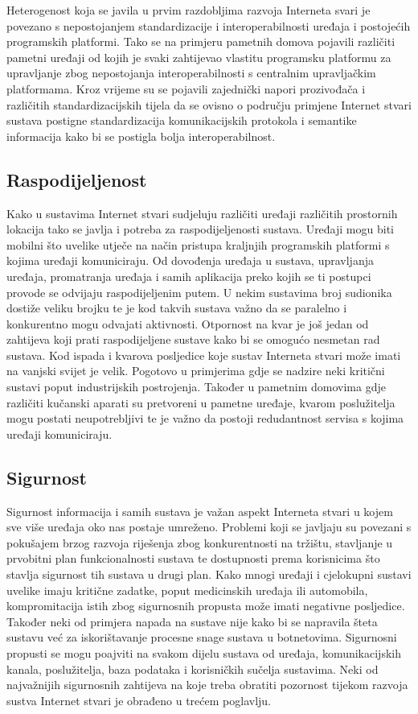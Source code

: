 \documentclass[times, utf8, diplomski]{fer}
\begin{document}
Heterogenost koja se javila u prvim razdobljima razvoja Interneta svari je povezano s nepostojanjem standardizacije i interoperabilnosti uređaja i postojećih programskih platformi. Tako se na primjeru pametnih domova pojavili različiti pametni uređaji od kojih je svaki zahtijevao vlastitu programsku platformu za upravljanje zbog nepostojanja interoperabilnosti s centralnim upravljačkim platformama. Kroz vrijeme su se pojavili zajednički napori prozivođača i različitih standardizacijskih tijela da se ovisno o području primjene Internet stvari sustava postigne standardizacija komunikacijskih protokola i semantike informacija kako bi se postigla bolja interoperabilnost.

\subsection{Raspodijeljenost}
Kako u sustavima Internet stvari sudjeluju različiti uređaji različitih prostornih lokacija tako se javlja i potreba za raspodijeljenosti sustava. Uređaji mogu biti mobilni što uvelike utječe na način pristupa kraljnjih programskih platformi s kojima uređaji komuniciraju. Od dovođenja uređaja u sustava, upravljanja uređaja, promatranja uređaja i samih aplikacija preko kojih se ti postupci provode se odvijaju raspodijeljenim putem. U nekim sustavima broj sudionika dostiže veliku brojku te je kod takvih sustava važno da se paralelno i konkurentno mogu odvajati aktivnosti. Otpornost na kvar je još jedan od zahtijeva koji prati raspodijeljene sustave kako bi se omogućo nesmetan rad sustava. Kod ispada i kvarova posljedice koje sustav Interneta stvari može imati na vanjski svijet je velik. Pogotovo u primjerima gdje se nadzire neki kritični sustavi poput industrijskih postrojenja. Također u pametnim domovima gdje različiti kučanski aparati su pretvoreni u pametne uređaje, kvarom poslužitelja mogu postati neupotrebljivi te je važno da postoji redudantnost servisa s kojima uređaji komuniciraju.

\subsection{Sigurnost}
Sigurnost informacija i samih sustava je važan aspekt Interneta stvari u kojem sve više uređaja oko nas postaje umreženo. Problemi koji se javljaju su povezani s pokušajem brzog razvoja riješenja zbog konkurentnosti na tržištu, stavljanje u prvobitni plan funkcionalnosti sustava te dostupnosti prema korisnicima što stavlja sigurnost tih sustava u drugi plan. Kako mnogi uređaji i cjelokupni sustavi uvelike imaju kritične zadatke, poput medicinskih uređaja ili automobila, kompromitacija istih zbog sigurnosnih propusta može imati negativne posljedice. Također neki od primjera napada na sustave nije kako bi se napravila šteta sustavu već za iskorištavanje procesne snage sustava u botnetovima. Sigurnosni propusti se mogu poajviti na svakom dijelu sustava od uređaja, komunikacijskih kanala, poslužitelja, baza podataka i korisničkih sučelja sustavima. Neki od najvažnijih sigurnosnih zahtijeva na koje treba obratiti pozornost tijekom razvoja sustva Internet stvari je obrađeno u trećem poglavlju.
\end{document}
